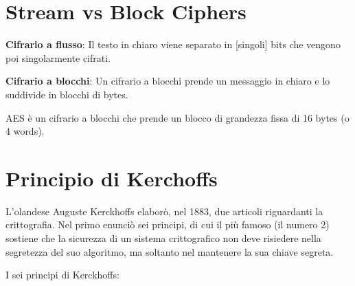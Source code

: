 \section{Stream vs Block Ciphers}

       

\textsf{\small \textbf{Cifrario a flusso}: Il testo in chiaro viene separato in [singoli] bits che vengono poi singolarmente cifrati.} %

\textsf{\small \textbf{Cifrario a blocchi}: Un cifrario a blocchi prende un messaggio in chiaro e lo suddivide in blocchi di bytes.} %

\textsf{\small  AES è un cifrario a blocchi che prende un blocco di grandezza fissa di 16 bytes (o 4 words).}



\section{Principio di Kerchoffs}


\textsf{\small L'olandese Auguste Kerckhoffs elaborò, nel 1883, due articoli riguardanti la crittografia. Nel primo enunciò sei principi, di cui il più famoso (il numero 2) sostiene che la sicurezza di un sistema crittografico non deve risiedere nella segretezza del suo algoritmo, ma soltanto nel mantenere la sua chiave segreta.} %

\textsf{\small I sei principi di Kerckhoffs:} %


